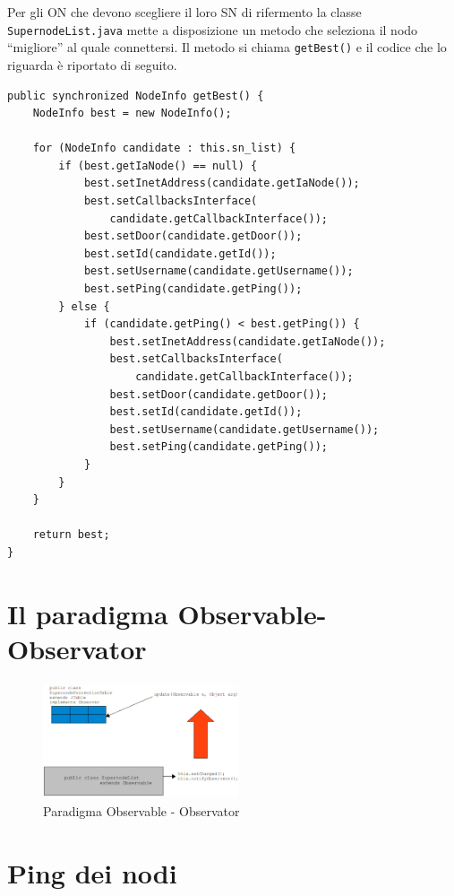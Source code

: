Per gli ON che devono scegliere il loro SN di rifermento la classe \verb|SupernodeList.java| mette a disposizione un metodo che seleziona il nodo ``migliore'' al quale connettersi. Il metodo si chiama \verb|getBest()| e il codice che lo riguarda è riportato di seguito.
\begin{lstlisting}
public synchronized NodeInfo getBest() {
	NodeInfo best = new NodeInfo();

	for (NodeInfo candidate : this.sn_list) {
		if (best.getIaNode() == null) {
			best.setInetAddress(candidate.getIaNode());
			best.setCallbacksInterface(
				candidate.getCallbackInterface());
			best.setDoor(candidate.getDoor());
			best.setId(candidate.getId());
			best.setUsername(candidate.getUsername());
			best.setPing(candidate.getPing());
		} else {
			if (candidate.getPing() < best.getPing()) {
				best.setInetAddress(candidate.getIaNode());
				best.setCallbacksInterface(
					candidate.getCallbackInterface());
				best.setDoor(candidate.getDoor());
				best.setId(candidate.getId());
				best.setUsername(candidate.getUsername());
				best.setPing(candidate.getPing());
			}
		}
	}
	
	return best;
}
\end{lstlisting}


\section{Il paradigma Observable-Observator}
\begin{figure}
 \centering
 \includegraphics[width=218.72px,height=129.12px,bb=14 14 635 381]{images/observable.eps}
 \caption{Paradigma Observable - Observator}
 \label{fig:observable}
\end{figure}

\section{Ping dei nodi}\label{sec:ping}

